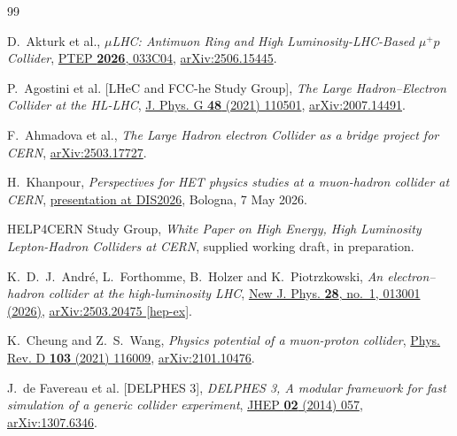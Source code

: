 \begin{thebibliography}{99}

D.~Akturk et al., \emph{$\mu$LHC: Antimuon Ring and High Luminosity-LHC-Based $\mu^+p$ Collider},
\href{https://doi.org/10.1093/ptep/ptag031}{PTEP \textbf{2026}, 033C04},
\href{https://arxiv.org/abs/2506.15445}{arXiv:2506.15445}.



P.~Agostini et al. [LHeC and FCC-he Study Group], \emph{The Large Hadron--Electron Collider at the HL-LHC},
\href{https://doi.org/10.1088/1361-6471/abf3ba}{J. Phys. G \textbf{48} (2021) 110501},
\href{https://arxiv.org/abs/2007.14491}{arXiv:2007.14491}.



F.~Ahmadova et al., \emph{The Large Hadron electron Collider as a bridge project for CERN},
\href{https://arxiv.org/abs/2503.17727}{arXiv:2503.17727}.



H.~Khanpour, \emph{Perspectives for HET physics studies at a muon-hadron collider at CERN},
\href{https://agenda.infn.it/event/47074/contributions/289107/}{presentation at DIS2026},
Bologna, 7 May 2026.



HELP4CERN Study Group, \emph{White Paper on High Energy, High Luminosity Lepton-Hadron Colliders at CERN},
supplied working draft, in preparation.



K.~D.~J.~Andr{\'e}, L.~Forthomme, B.~Holzer and K.~Piotrzkowski,
\emph{An electron--hadron collider at the high-luminosity LHC},
\href{https://doi.org/10.1088/1367-2630/ae2e31}
{New J. Phys. \textbf{28}, no.~1, 013001 (2026)},
\href{https://arxiv.org/abs/2503.20475}
{arXiv:2503.20475 [hep-ex]}.


K.~Cheung and Z.~S.~Wang, \emph{Physics potential of a muon-proton collider},
\href{https://doi.org/10.1103/PhysRevD.103.116009}{Phys. Rev. D \textbf{103} (2021) 116009},
\href{https://arxiv.org/abs/2101.10476}{arXiv:2101.10476}.



J.~de Favereau et al. [DELPHES 3], \emph{DELPHES 3, A modular framework for fast simulation of a generic collider experiment},
\href{https://doi.org/10.1007/JHEP02(2014)057}{JHEP \textbf{02} (2014) 057},
\href{https://arxiv.org/abs/1307.6346}{arXiv:1307.6346}.





\end{thebibliography}
